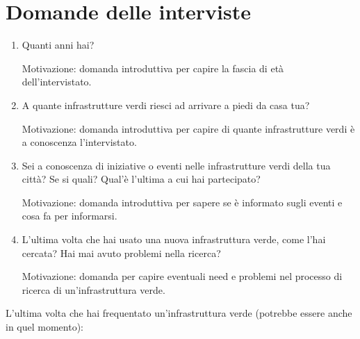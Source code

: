 \section{Domande delle interviste}
\begin{enumerate}
    \item Quanti anni hai?

    Motivazione: domanda introduttiva per capire la fascia di età dell'intervistato.
    \item A quante infrastrutture verdi riesci ad arrivare a piedi da casa tua?
    
    Motivazione: domanda introduttiva per capire di quante infrastrutture verdi è a conoscenza l'intervistato.
    \item Sei a conoscenza di iniziative o eventi nelle infrastrutture verdi della tua città? Se si quali? Qual'è l'ultima a cui hai partecipato?
    
    Motivazione: domanda introduttiva per sapere se è informato sugli eventi e cosa fa per informarsi.
    \item L'ultima volta che hai usato una nuova infrastruttura verde, come l'hai cercata? Hai mai avuto problemi nella ricerca?

    Motivazione: domanda per capire eventuali need e problemi nel processo di ricerca di un'infrastruttura verde.
\end{enumerate}
L'ultima volta che hai frequentato un'infrastruttura verde (potrebbe essere anche in quel momento):
